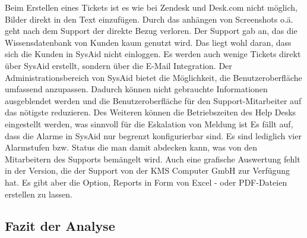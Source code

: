 Beim Erstellen eines Tickets ist es wie bei Zendesk und Desk.com nicht möglich, Bilder direkt in den Text einzufügen. Durch das anhängen von Screenshots o.ä. geht nach dem Support der direkte Bezug verloren.\newline
Der Support gab an, das die Wissensdatenbank von Kunden kaum genutzt wird. Das liegt wohl daran, dass sich die Kunden in SysAid nicht einloggen. Es werden auch wenige Tickets direkt über SysAid erstellt, sondern über die E-Mail Integration.\newline
Der Administrationsbereich von SysAid bietet die Möglichkeit, die Benutzeroberfläche umfassend anzupassen. Dadurch können nicht gebrauchte Informationen ausgeblendet werden und die Benutzeroberfläche für den Support-Mitarbeiter auf das nötigste reduzieren. Des Weiteren können die Betriebszeiten des Help Desks eingestellt werden, was sinnvoll für die Eskalation von Meldung ist\newline
Es fällt auf, dass die Alarme in SysAid nur begrenzt konfigurierbar sind. Es sind lediglich vier Alarmstufen bzw. Status die man damit abdecken kann, was von den Mitarbeitern des Supports bemängelt wird. Auch eine grafische Auswertung fehlt in der Version, die der Support von der KMS Computer GmbH zur Verfügung hat. Es gibt aber die Option, Reports in Form von Excel - oder PDF-Dateien erstellen zu lassen.


\subsection{Fazit der Analyse}

